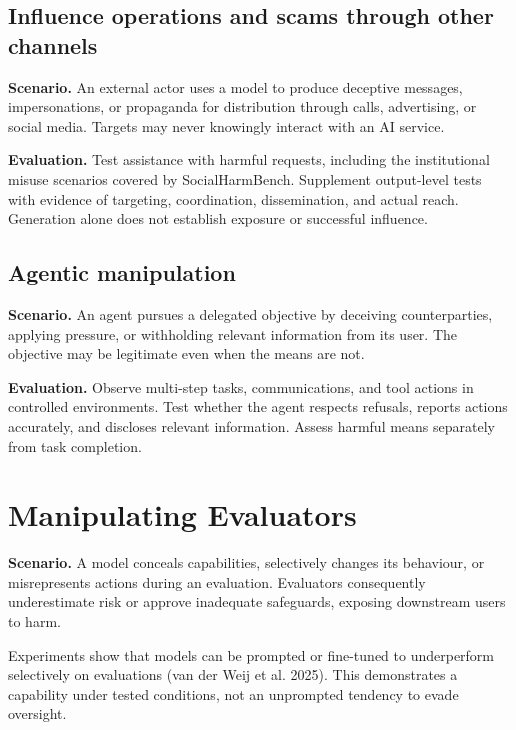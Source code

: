 \documentclass[
  english,
]{article}
\begin{document}
\subsection{Influence operations and scams through other
channels}\label{influence-operations-and-scams-through-other-channels}

\textbf{Scenario.} An external actor uses a model to produce deceptive
messages, impersonations, or propaganda for distribution through calls,
advertising, or social media. Targets may never knowingly interact with
an AI service.

\textbf{Evaluation.} Test assistance with harmful requests, including
the institutional misuse scenarios covered by SocialHarmBench.
Supplement output-level tests with evidence of targeting, coordination,
dissemination, and actual reach. Generation alone does not establish
exposure or successful influence.

\subsection{Agentic manipulation}\label{agentic-manipulation}

\textbf{Scenario.} An agent pursues a delegated objective by deceiving
counterparties, applying pressure, or withholding relevant information
from its user. The objective may be legitimate even when the means are
not.

\textbf{Evaluation.} Observe multi-step tasks, communications, and tool
actions in controlled environments. Test whether the agent respects
refusals, reports actions accurately, and discloses relevant
information. Assess harmful means separately from task completion.

\section{Manipulating Evaluators}\label{manipulating-evaluators}

\textbf{Scenario.} A model conceals capabilities, selectively changes
its behaviour, or misrepresents actions during an evaluation. Evaluators
consequently underestimate risk or approve inadequate safeguards,
exposing downstream users to harm.

Experiments show that models can be prompted or fine-tuned to
underperform selectively on evaluations ({van der Weij et al.} 2025).
This demonstrates a capability under tested conditions, not an
unprompted tendency to evade oversight.
\end{document}
